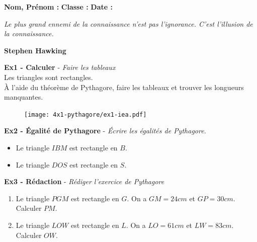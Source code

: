


\textbf{Nom, Prénom :} \hspace{8cm} \textbf{Classe :} \hspace{3cm} \textbf{Date :}\\

\begin{center}
  \textit{Le plus grand ennemi de la connaissance n'est pas l'ignorance. C'est l'illusion de la connaissance.} 
  
  \textbf{Stephen Hawking}
\end{center}

\begin{multicols}{2}

\textbf{Ex1 - Calculer} - \textit{Faire les tableaux}\\

Les triangles sont rectangles. \\ 

À l'aide du théorème de Pythagore, faire les tableaux et trouver les longueurs manquantes. \columnbreak

\begin{figure}[H]
  \centering
  \texttt{[image: 4x1-pythagore/ex1-iea.pdf]}
\end{figure} 

\end{multicols} 

\textbf{Ex2 - Égalité de Pythagore} - \textit{Écrire les égalités de Pythagore.}\\

\begin{itemize}
  \item[1.] Le triangle $IBM$ est rectangle en $B$. 
  \item[2.] Le triangle $DOS$ est rectangle en $S$. \\
\end{itemize}

\textbf{Ex3 - Rédaction} - \textit{Rédiger l'exercice de Pythagore}\\

\begin{enumerate}
  \item[1.] Le triangle $PGM$ est rectangle en $G$. On a $GM = 24cm$ et $GP = 30cm$. Calculer $PM$. 
  \item[2.] Le triangle $LOW$ est rectangle en $L$. On a $LO = 61cm$ et $LW = 83cm$. Calculer $OW$. \\
\end{enumerate} 

